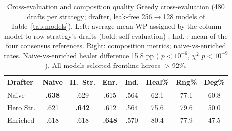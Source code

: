 \documentclass[journal]{IEEEtran}
\providecommand{\DIFaddtex}[1]{{\protect\color{blue} \sf #1}} %
\providecommand{\DIFdeltex}[1]{{\protect\color{red} \scriptsize #1}} %
\providecommand{\DIFdelend}{} %
\providecommand{\DIFaddFL}[1]{\DIFadd{#1}} %
\providecommand{\DIFdelFL}[1]{\DIFdel{#1}} %
\providecommand{\DIFaddbeginFL}{} %
\providecommand{\DIFaddendFL}{} %
\providecommand{\DIFdelbeginFL}{} %
\providecommand{\DIFdelendFL}{} %
\providecommand{\DIFadd}[1]{\texorpdfstring{\DIFaddtex{#1}}{#1}} %
\providecommand{\DIFdel}[1]{\texorpdfstring{\DIFdeltex{#1}}{}} %
\begin{document}
\DIFdelend \begin{table}[t]
\centering
\caption{\DIFdelbeginFL \DIFdelFL{Cross-evaluation and composition quality }\DIFdelendFL \DIFaddbeginFL \DIFaddFL{Greedy cross-evaluation }\DIFaddendFL (480 drafts per \DIFdelbeginFL \DIFdelFL{strategy; }\DIFdelendFL \DIFaddbeginFL \DIFaddFL{drafter, leak-free }\DIFaddendFL 256$\to$128 models\DIFdelbeginFL \DIFdelFL{of Table~\ref{tab:models}}\DIFdelendFL ). Left: \DIFdelbeginFL \DIFdelFL{average }\DIFdelendFL \DIFaddbeginFL \DIFaddFL{mean }\DIFaddendFL WP assigned by \DIFaddbeginFL \DIFaddFL{the }\DIFaddendFL column model \DIFdelbeginFL \DIFdelFL{to row strategy's drafts }\DIFdelendFL (bold: self-evaluation)\DIFaddbeginFL \DIFaddFL{; Ind}\DIFaddendFL .\DIFaddbeginFL \DIFaddFL{: mean of the four consensus references. }\DIFaddendFL Right: composition \DIFdelbeginFL \DIFdelFL{metrics; naive-vs-enriched }\DIFdelendFL \DIFaddbeginFL \DIFaddFL{rates. Naive-vs-enriched }\DIFaddendFL healer difference \DIFdelbeginFL \DIFdelFL{15.8}\DIFdelendFL \DIFaddbeginFL \DIFaddFL{18.3}\DIFaddendFL pp (\DIFdelbeginFL \DIFdelFL{$p < 10^{-6}$, $\chi^2$}\DIFdelendFL \DIFaddbeginFL \DIFaddFL{$p < 10^{-9}$}\DIFaddendFL ).\DIFdelbeginFL \DIFdelFL{All models selected frontline heroes $>$92\%.}\DIFdelendFL }
\label{tab:crosseval}\label{tab:comp}
\DIFdelbeginFL %
\DIFdelendFL \DIFaddbeginFL \setlength{\tabcolsep}{3.3pt}
\begin{tabular}{lcccc|ccc}
\toprule
Drafter & Naive & H.~Str. & Enr. & Ind. & Heal\% & Rng\% & Deg\% \\
\midrule
Naive & \textbf{.638} & .629 & .615 & .564 & 62.1 & 77.1 & 60.8 \\
Hero Str. & .621 & \textbf{.642} & .612 & .564 & 75.6 & 79.6 & 50.0 \\
Enriched & .618 & .618 & \textbf{.648} & .570 & 80.4 & 77.9 & 47.5 \\
\bottomrule
\end{tabular}
\DIFaddendFL \end{table}
\end{document}
